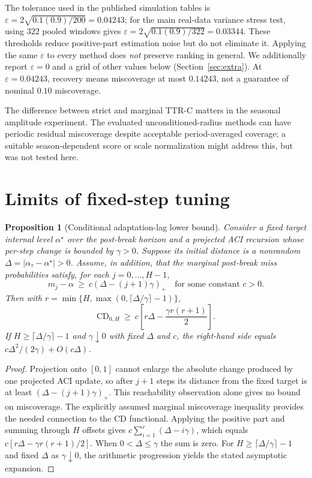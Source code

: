 \documentclass[10pt]{article}
\newtheorem{proposition}{Proposition}
\begin{document}
The tolerance used in the published simulation tables is
$\varepsilon=2\sqrt{0.1(0.9)/200}=0.04243$; for the main real-data
variance stress test, using $322$ pooled windows gives
$\varepsilon=2\sqrt{0.1(0.9)/322}=0.03344$. These thresholds
reduce positive-part estimation noise but do not eliminate it.
Applying the same $\varepsilon$ to every method does \emph{not} preserve
ranking in general. We additionally report $\varepsilon=0$ and a grid of
other values below (Section~\ref{sec:extra}). At $\varepsilon=0.04243$,
recovery means miscoverage at most $0.14243$, not a guarantee of nominal
$0.10$ miscoverage.

The difference between strict and marginal TTR-C matters in the seasonal
amplitude experiment. The evaluated unconditioned-radius methods can have
periodic residual miscoverage despite acceptable period-averaged coverage;
a suitable season-dependent score or scale normalization might address this,
but was not tested here.

\section{Limits of fixed-step tuning}
\label{sec:theory}

\begin{proposition}[Conditional adaptation-lag lower bound]
\label{prop:lag}
Consider a fixed target internal level $\alpha^\star$ over the post-break
horizon and a projected ACI recursion whose per-step change is bounded
by $\gamma>0$. Suppose its initial distance is a nonrandom
$\Delta=|\alpha_\tau-\alpha^\star|>0$. Assume, in addition, that the
\emph{marginal} post-break miss probabilities satisfy, for each
$j=0,\ldots,H-1$,
\[
m_j-\alpha\ \geq\ c(\Delta-(j+1)\gamma)_+
\quad\text{for some constant }c>0.
\]
Then with $r=\min\{H,\max(0,\lceil\Delta/\gamma\rceil-1)\}$,
\begin{equation}
\mathrm{CD}_{0,H}\ \geq\
c\!\left[r\Delta-\frac{\gamma r(r+1)}{2}\right].
\label{eq:lagbound}
\end{equation}
If $H\geq\lceil\Delta/\gamma\rceil-1$ and $\gamma\downarrow0$
with fixed $\Delta$ and $c$, the right-hand side equals
$c\Delta^2/(2\gamma)+O(c\Delta)$.
\end{proposition}

\begin{proof}
Projection onto $[0,1]$ cannot enlarge the absolute change produced by
one projected ACI update, so after $j+1$ steps its distance from the fixed
target is at least $(\Delta-(j+1)\gamma)_+$. This reachability observation
alone gives no bound on miscoverage. The explicitly assumed marginal
miscoverage inequality provides the needed connection to the CD functional.
Applying the positive part and summing through $H$ offsets gives
$c\sum_{i=1}^{r}(\Delta-i\gamma)$, which equals
$c[r\Delta-\gamma r(r+1)/2]$. When $0<\Delta\leq\gamma$ the sum is zero.
For $H\geq\lceil\Delta/\gamma\rceil-1$ and fixed $\Delta$ as
$\gamma\downarrow0$, the arithmetic progression yields the stated
asymptotic expansion.\qedhere
\end{proof}
\end{document}
